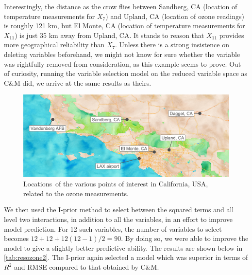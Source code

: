 \documentclass[11pt,twoside,openright]{report}
\begin{document}

Interestingly, the distance as the crow flies between Sandberg, CA (location of temperature measurements for $X_7$) and Upland, CA (location of ozone readings) is roughly 121 km, but El Monte, CA (location of temperature measurements for $X_{11}$) is just 35 km away from Upland, CA.
It stands to reason that $X_{11}$ provides more geographical reliability than $X_7$.
Unless there is a strong insistence on deleting variables beforehand, we might not know for sure whether the variable was rightfully removed from consideration, as this example seems to prove.
Out of curiosity, running the variable selection model on the reduced variable space as C\&M did, we arrive at the same results as theirs.

\begin{figure}[htb]
  \centering
  \vspace{3pt}
  \includegraphics[width=\textwidth]{figure/06-ozone_map}
  \caption[Locations of the various points of interest in California, USA, related to the ozone measurements]{Locations\footnotemark~of the various points of interest in California, USA, related to the ozone measurements.}
  \label{fig:aerobic-densplot       }
\end{figure}

We then used the I-prior method to select between the squared terms and all level two interactions, in addition to all the variables, in an effort to improve model prediction. 
For 12 such variables, the number of variables to select becomes $12 + 12 + 12(12 - 1)/2 = 90$. 
By doing so, we were able to improve the model to give a slightly better predictive ability.
The results are shown below in \cref{tab:resozone2}. 
The I-prior again selected a model which was superior in terms of $R^2$ and RMSE compared to that obtained by C\&M.
\end{document}
